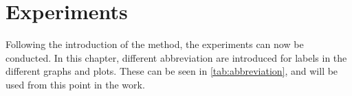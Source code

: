 \chapter{Experiments}

Following the introduction of the method, the experiments can now be conducted. In this chapter, different abbreviation are introduced for labels in the different graphs and plots. These can be seen in \cref*{tab:abbreviation}, and will be used from this point in the work.






